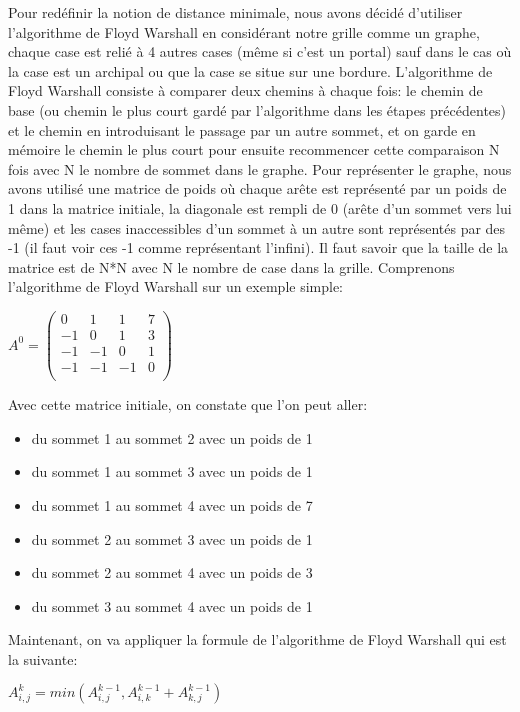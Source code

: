 Pour redéfinir la notion de distance minimale, nous avons décidé d'utiliser l'algorithme de Floyd Warshall en considérant notre grille comme un graphe, chaque case est relié à 4 autres cases (même si c'est un portal) sauf dans le cas où la case est un archipal ou que la case se situe sur une bordure. L'algorithme de Floyd Warshall consiste à comparer deux chemins à chaque fois: le chemin de base (ou chemin le plus court gardé par l'algorithme dans les étapes précédentes) et le chemin en introduisant le passage par un autre sommet, et on garde en mémoire le chemin le plus court pour ensuite recommencer cette comparaison N fois avec N le nombre de sommet dans le graphe. Pour représenter le graphe, nous avons utilisé une matrice de poids où chaque arête est représenté par un poids de 1 dans la matrice initiale, la diagonale est rempli de 0 (arête d'un sommet vers lui même) et les cases inaccessibles d'un sommet à un autre sont représentés par des -1 (il faut voir ces -1 comme représentant l'infini). Il faut savoir que la taille de la matrice est de N*N avec N le nombre de case dans la grille. Comprenons l'algorithme de Floyd Warshall sur un exemple simple:
\begin{center}
$ A^0=
\begin{pmatrix} 
0 & 1 & 1 & 7 \\
-1 & 0 & 1 & 3 \\
-1 & -1 & 0 & 1 \\
-1 & -1 & -1 & 0 \\
\end{pmatrix}
$
\end{center}
Avec cette matrice initiale, on constate que l'on peut aller:
\begin{itemize}
\item du sommet 1 au sommet 2 avec un poids de 1
\item du sommet 1 au sommet 3 avec un poids de 1
\item du sommet 1 au sommet 4 avec un poids de 7
\item du sommet 2 au sommet 3 avec un poids de 1
\item du sommet 2 au sommet 4 avec un poids de 3
\item du sommet 3 au sommet 4 avec un poids de 1
\end{itemize}
Maintenant, on va appliquer la formule de l'algorithme de Floyd Warshall qui est la suivante: 
\begin{center}
$A_{i,j}^k = min ( A_{i,j}^{k-1}, A_{i,k}^{k-1} + A_{k,j}^{k-1} )$ 
\end{center}
